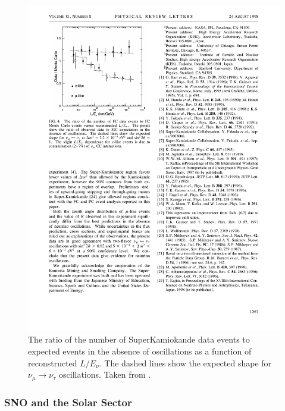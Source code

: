 \begin{figure}
  \centering
  \includegraphics{SuperKamiokandeLE.pdf}
  \caption[The ratio of the number of SuperKamiokande data events to expected events in the absence of oscillations as a function of reconstructed $L/E_{\nu}$.]{The ratio of the number of SuperKamiokande data events to expected events in the absence of oscillations as a function of reconstructed $L/E_{\nu}$.  The dashed lines show the expected shape for $\nu_{\mu}\rightarrow\nu_{\tau}$ oscillations.  Taken from \cite{SuperKamiokande1998}.}
  \label{fig:SuperKamiokandeLE}
\end{figure}

\subsubsection{SNO and the Solar Sector}\label{sec:SNO}


